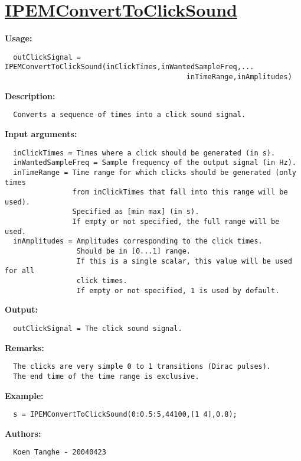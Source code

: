 \newpage
\section*{\hyperlink{Concepts:IPEMConvertToClickSound}{IPEMConvertToClickSound}}
\hypertarget{FuncRef:IPEMConvertToClickSound}{}

\textbf{Usage:}
\begin{verbatim}  outClickSignal = IPEMConvertToClickSound(inClickTimes,inWantedSampleFreq,...
                                           inTimeRange,inAmplitudes)

\end{verbatim}
\textbf{Description:}
\begin{verbatim}  Converts a sequence of times into a click sound signal.

\end{verbatim}
\textbf{Input arguments:}
\begin{verbatim}  inClickTimes = Times where a click should be generated (in s).
  inWantedSampleFreq = Sample frequency of the output signal (in Hz).
  inTimeRange = Time range for which clicks should be generated (only times
                from inClickTimes that fall into this range will be used).
                Specified as [min max] (in s).
                If empty or not specified, the full range will be used.
  inAmplitudes = Amplitudes corresponding to the click times.
                 Should be in [0...1] range.
                 If this is a single scalar, this value will be used for all
                 click times.
                 If empty or not specified, 1 is used by default.

\end{verbatim}
\textbf{Output:}
\begin{verbatim}  outClickSignal = The click sound signal.

\end{verbatim}
\textbf{Remarks:}
\begin{verbatim}  The clicks are very simple 0 to 1 transitions (Dirac pulses).
  The end time of the time range is exclusive.

\end{verbatim}
\textbf{Example:}
\begin{verbatim}  s = IPEMConvertToClickSound(0:0.5:5,44100,[1 4],0.8);

\end{verbatim}
\textbf{Authors:}
\begin{verbatim}  Koen Tanghe - 20040423
\end{verbatim}


